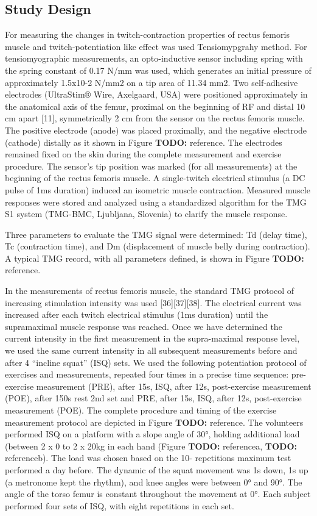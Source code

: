 \documentclass[utf8]{style/FrontiersinHarvard}
\newcommand{\TODO}[1]{{\textbf{TODO:} {\color{red} #1}}}
\begin{document}
\subsection{Study Design}
For measuring the changes in twitch-contraction properties of rectus femoris muscle and twitch-potentiation like effect was used Tensiomypgrahy method.
For tensiomyographic measurements, an opto-inductive sensor including spring with the spring constant of 0.17 N/mm was used, which generates an initial pressure of approximately 1.5x10-2 N/mm2 on a tip area of 11.34 mm2.
Two self-adhesive electrodes (UltraStim® Wire, Axelgaard, USA) were positioned approximately in the anatomical axis of the femur, proximal on the beginning of RF and distal 10 cm apart [11], symmetrically 2 cm from the sensor on the rectus femoris muscle.
The positive electrode (anode) was placed proximally, and the negative electrode (cathode) distally as it shown in Figure \TODO{reference}.
The electrodes remained fixed on the skin during the complete measurement and exercise procedure.
The sensor's tip position was marked (for all measurements) at the beginning of the rectus femoris muscle.
A single-twitch electrical stimulus (a DC pulse of 1ms duration) induced an isometric muscle contraction.
Measured muscle responses were stored and analyzed using a standardized algorithm for the TMG S1 system (TMG-BMC, Ljubljana, Slovenia) to clarify the muscle response.

Three parameters to evaluate the TMG signal were determined: Td (delay time), Tc (contraction time), and Dm (displacement of muscle belly during contraction).
A typical TMG record, with all parameters defined, is shown in Figure \TODO{reference}.

In the measurements of rectus femoris muscle, the standard TMG protocol of increasing stimulation intensity was used [36][37][38].
The electrical current was increased after each twitch electrical stimulus (1ms duration) until the supramaximal muscle response was reached.
Once we have determined the current intensity in the first measurement in the supra-maximal response level, we used the same current intensity in all subsequent measurements before and after 4 “incline squat” (ISQ) sets.
We used the following potentiation protocol of exercises and measurements, repeated four times in a precise time sequence: pre-exercise measurement (PRE), after 15s, ISQ, after 12s, post-exercise measurement (POE), after 150s rest 2nd set and PRE, after 15s, ISQ, after 12s, post-exercise measurement (POE).
The complete procedure and timing of the exercise measurement protocol are depicted in Figure \TODO{reference}.
The volunteers performed ISQ on a platform with a slope angle of 30°, holding additional load (between 2 x 0 to 2 x 20kg in each hand (Figure \TODO{reference}a, \TODO{reference}b).
The load was chosen based on the 10- repetitions maximum test performed a day before.
The dynamic of the squat movement was 1s down, 1s up (a metronome kept the rhythm), and knee angles were between 0° and 90°.
The angle of the torso femur is constant throughout the movement at 0°.
Each subject performed four sets of ISQ, with eight repetitions in each set.
\end{document}
